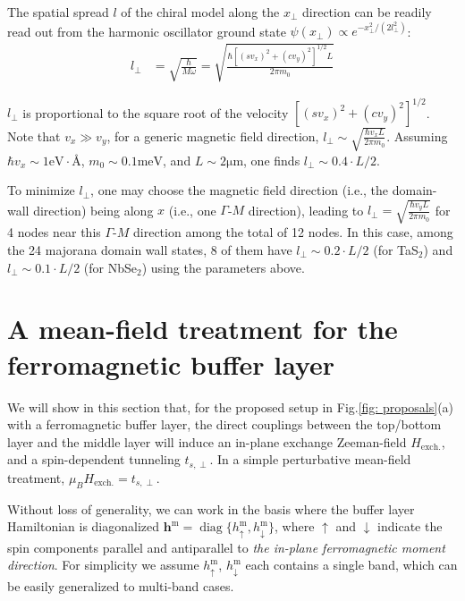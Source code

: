 \begin{subappendices}
	The spatial spread $l$ of the chiral model along the $x_\perp$ direction can be readily read out from the harmonic oscillator ground state $\psi(x_\perp)\propto e^{-x_\perp^2/(2l_\perp^2)}$:
	\begin{align}
		l_\perp & =\sqrt{\frac{\hbar}{M\omega}}=\sqrt{\frac{\hbar [(sv_x)^2+(cv_y)^2]^{1/2} L}{2\pi m_0}}
	\end{align}

	$l_\perp$ is proportional to the square root of the velocity $[(sv_x)^2+(cv_y)^2]^{1/2}$. Note that $v_x\gg v_y$, for a generic magnetic field direction, $l_\perp\sim \sqrt{\frac{\hbar v_x L}{2\pi m_0}}$. Assuming $\hbar v_x\sim 1\mathrm{eV}\cdot\text{\AA}$, $m_0\sim 0.1\mathrm{meV}$, and $L\sim 2\mathrm{\mu m}$, one finds $l_\perp\sim 0.4\cdot L/2$.

	To minimize $l_\perp$, one may choose the magnetic field direction (i.e., the domain-wall direction) being along $x$ (i.e., one $\Gamma$-$M$ direction), leading to $l_\perp=\sqrt{\frac{\hbar v_y L}{2\pi m_0}}$ for 4 nodes near this $\Gamma$-$M$ direction among the total of 12 nodes. In this case, among the 24 majorana domain wall states, 8 of them have $l_\perp\sim 0.2\cdot L/2$ (for TaS$_2$) and $l_\perp\sim 0.1\cdot L/2$ (for NbSe$_2$) using the parameters above.

	\section{A mean-field treatment for the ferromagnetic buffer layer}\label{app:magnetic_buffer_layer_perturbation}
	We will show in this section that, for the proposed setup in Fig.\ref{fig: proposals}(a) with a ferromagnetic buffer layer, the direct couplings between the top/bottom layer and the middle layer will induce an in-plane exchange Zeeman-field $H_{\text{exch.}}$, and a spin-dependent tunneling $t_{s,\perp}$. In a simple perturbative mean-field treatment, $\mu_B H_{\text{exch.}}=t_{s,\perp}$.


	Without loss of generality, we can work in the basis where the buffer layer Hamiltonian is diagonalized $\bm{h}^\text{m}=\mathop{\mathrm{diag}}\{h^{\text{m}}_\uparrow, h^\text{m}_\downarrow\}$, where $\uparrow$ and $\downarrow$ indicate the spin components parallel and antiparallel to \emph{the in-plane ferromagnetic moment direction}. For simplicity we assume $h^{\text{m}}_\uparrow$, $h^{\text{m}}_\downarrow$ each contains a single band, which can be easily generalized to multi-band cases.



\end{subappendices}
